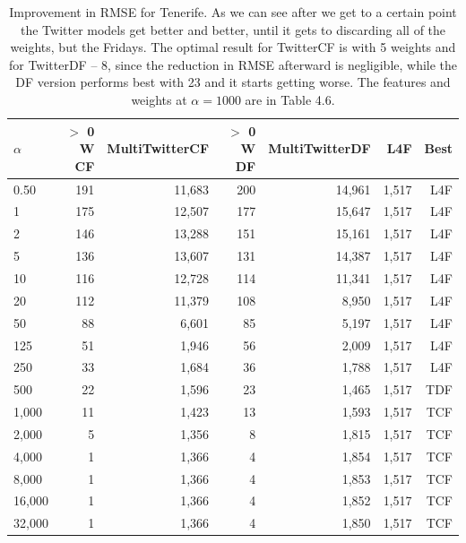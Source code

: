 \documentclass[minf,twoside,singlespacing,parskip,frontabs]{infthesis}
\begin{document}
\begin{table}[]
\begin{center}
\begin{tabular}{ l | r | r | r | r | r | r}
$\alpha$ & $>$ 0 W CF & MultiTwitterCF & $>$ 0 W DF & MultiTwitterDF & L4F & Best\\
\hline
0.50 & 191 & 11,683 & 200 & 14,961 & 1,517 & L4F\\
1 & 175 & 12,507 & 177 & 15,647 & 1,517 & L4F\\
2 & 146 & 13,288 & 151 & 15,161 & 1,517 & L4F\\
5 & 136 & 13,607 & 131 & 14,387 & 1,517 & L4F\\
10 & 116 & 12,728 & 114 & 11,341 & 1,517 & L4F\\
20 & 112 & 11,379 & 108 & 8,950 & 1,517 & L4F\\
50 & 88 & 6,601 & 85 & 5,197 & 1,517 & L4F\\
125 & 51 & 1,946 & 56 & 2,009 & 1,517 & L4F\\
250 & 33 & 1,684 & 36 & 1,788 & 1,517 & L4F\\
\hline
500 & 22 & 1,596 & 23 & 1,465 & 1,517 & TDF\\
1,000 & 11 & 1,423 & 13 & 1,593 & 1,517 & TCF\\
2,000 & 5 & 1,356 & 8 & 1,815 & 1,517 & TCF\\
4,000 & 1 & 1,366 & 4 & 1,854 & 1,517 & TCF\\
8,000 & 1 & 1,366 & 4 & 1,853 & 1,517 & TCF\\
16,000 & 1 & 1,366 & 4 & 1,852 & 1,517 & TCF\\
32,000 & 1 & 1,366 & 4 & 1,850 & 1,517 & TCF\\
\end{tabular}
\end{center}
\caption{Improvement in RMSE for Tenerife. As we can see after we get to a certain point the Twitter models get better and better, until it gets to discarding all of the weights, but the Fridays. The optimal result for TwitterCF is with 5 weights and for TwitterDF -- 8, since the reduction in RMSE afterward is negligible, while the DF version performs best with 23 and it starts getting worse. The features and weights at $\alpha = 1000$ are in Table 4.6.}
\label{table-tenerife}
\end{table}
\end{document}
